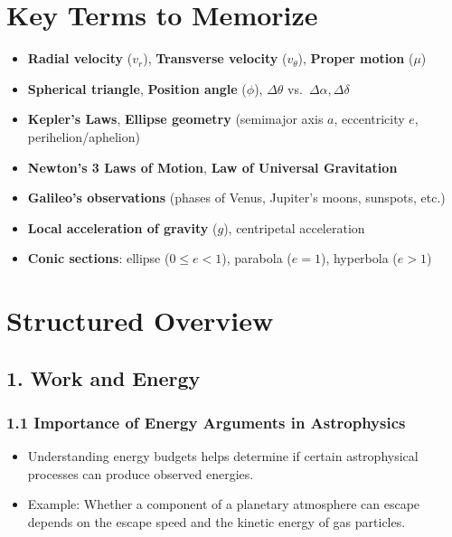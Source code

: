 \section{Key Terms to Memorize}
\begin{itemize}
  \item \textbf{Radial velocity} ($v_r$), \textbf{Transverse velocity} ($v_\theta$), \textbf{Proper motion} ($\mu$)
  \item \textbf{Spherical triangle}, \textbf{Position angle} ($\phi$), $\Delta \theta$ vs.\ $\Delta \alpha, \Delta \delta$
  \item \textbf{Kepler’s Laws}, \textbf{Ellipse geometry} (semimajor axis $a$, eccentricity $e$, perihelion/aphelion)
  \item \textbf{Newton’s 3 Laws of Motion}, \textbf{Law of Universal Gravitation}
  \item \textbf{Galileo’s observations} (phases of Venus, Jupiter’s moons, sunspots, etc.)
  \item \textbf{Local acceleration of gravity} ($g$), centripetal acceleration
  \item \textbf{Conic sections}: ellipse ($0 \le e < 1$), parabola ($e=1$), hyperbola ($e>1$)
\end{itemize}

\section{Structured Overview}

\subsection{1. Work and Energy}

\subsubsection{1.1 Importance of Energy Arguments in Astrophysics}
\begin{itemize}
  \item Understanding energy budgets helps determine if certain astrophysical processes can produce observed energies.
  \item Example: Whether a component of a planetary atmosphere can escape depends on the escape speed and the kinetic energy of gas particles.
\end{itemize}

